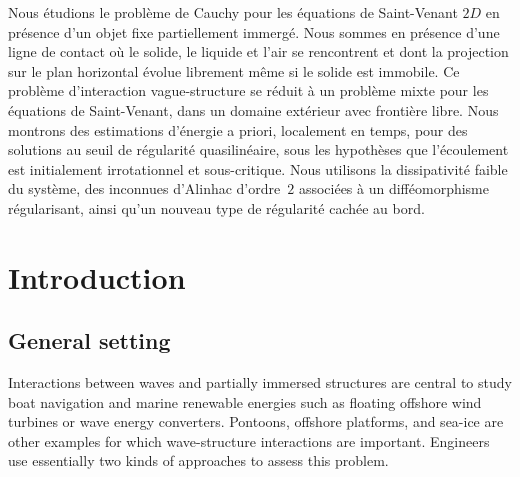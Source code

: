 \documentclass[JEP,XML,SOM,Unicode,NoFloatCountersInSection,published]{cedram}
\theoremstyle{definition}
\begin{document}



\begin{altabstract}
Nous étudions le problème de Cauchy pour les équations de Saint-Venant $2D$ en présence d'un objet fixe partiellement immergé. Nous sommes en présence d'une ligne de contact où le solide, le liquide et l'air se rencontrent et dont la projection sur le plan horizontal évolue librement même si le solide est immobile. Ce problème d'interaction vague-structure se réduit à un problème mixte pour les équations de Saint-Venant, dans un domaine extérieur avec frontière libre. Nous montrons des estimations d'énergie a priori, localement en temps, pour des solutions au seuil de régularité quasilinéaire, sous les hypothèses que l'écoulement est initialement irrotationnel et sous-critique. Nous utilisons la dissipativité faible du système, des inconnues d'Alinhac d'ordre~$2$ associées à un difféomorphisme régularisant, ainsi qu'un nouveau type de régularité cachée au bord.
\end{altabstract}

\maketitle
\vspace*{-\baselineskip}
\tableofcontents
\mainmatter

\section{Introduction}
\subsection{General setting}
Interactions between waves and partially immersed structures are central to study boat navigation and marine renewable energies
such as floating offshore wind turbines or wave energy converters.
Pontoons, offshore platforms, and sea-ice are other examples for which wave-structure interactions are important.
Engineers use essentially two kinds of approaches to assess this problem.
\end{document}

